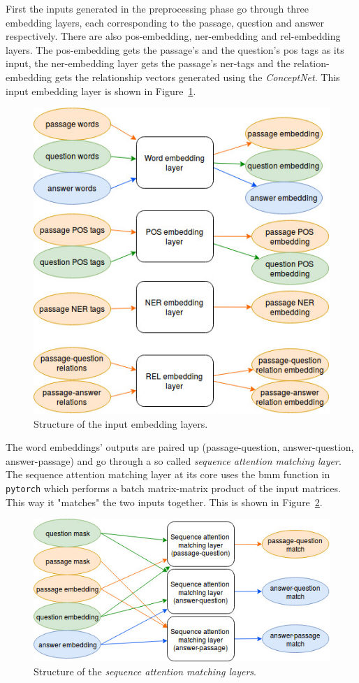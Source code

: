 First the inputs generated in the preprocessing phase go through three embedding layers, each corresponding to the passage, question and answer respectively. There are also pos-embedding, ner-embedding and rel-embedding layers. The pos-embedding gets the passage's and the question's pos tags as its input, the ner-embedding layer gets the passage's ner-tags and the relation-embedding gets the relationship vectors generated using the \textit{ConceptNet}. This input embedding layer is shown in Figure~\ref{fig:embedding}.
\begin{figure}[h!]
	\centering
	\includegraphics[scale=0.5]{figures/TriAN_embeddings.jpg}
	\caption{Structure of the input embedding layers.}
	\label{fig:embedding}
\end{figure}

The word embeddings' outputs are paired up (passage-question, answer-question, answer-passage) and go through a so called \textit{sequence attention matching layer}.
The sequence attention matching layer at its core uses the bmm function in \texttt{pytorch} which performs a batch matrix-matrix product of the input matrices.
This way it "matches" the two inputs together. This is shown in Figure~\ref{fig:attention_match}.
\begin{figure}[h!]
	\centering
	\includegraphics[scale=0.5]{figures/TriAN_attention_match.jpg}
	\caption{Structure of the \textit{sequence attention matching layers}.}
	\label{fig:attention_match}
\end{figure}

